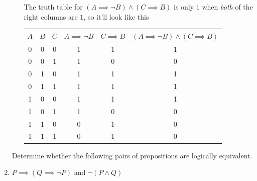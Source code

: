 \documentclass[11pt, preview]{standalone} %
\begin{document}
\begin{enumerate}
\begin{Choices}
\begin{enumerate}[(a)]
    The truth table for $(A \implies \lnot B) \land (C \implies B)$ is only $1$ when {\it both} of the right columns are $1$, so it'll look like this

    \begin{tabular}{ c | c | c || c | c | c} 
    $A$ & $B$ & $C$ & $A \implies \lnot B$ & $C \implies B$ & $(A \implies \lnot B) \land (C \implies B)$\\
    \hline
    0 & 0 & 0 & 1 & 1 & 1\\
    0 & 0 & 1 & 1 & 0 & 0\\
    0 & 1 & 0 & 1 & 1 & 1\\
    0 & 1 & 1 & 1 & 1 & 1\\
    1 & 0 & 0 & 1 & 1 & 1\\
    1 & 0 & 1 & 1 & 0 & 0\\
    1 & 1 & 0 & 0 & 1 & 0\\
    1 & 1 & 1 & 0 & 1 & 0
    \end{tabular}

  \end{enumerate}
\end{Choices}

Determine whether the following pairs of propositions are logically equivalent.
\item
$P \implies (Q \implies \neg P)$ and $\neg (P \land Q)$
\begin{enumerate}
\end{enumerate}


\end{enumerate}
\end{document}
